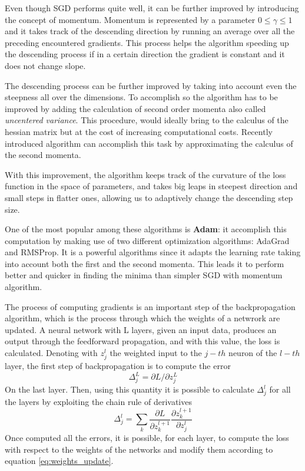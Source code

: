 \documentclass[11pt]{report}
\begin{document}
Even though SGD performs quite well, it can be further improved by introducing the concept of momentum.
Momentum is represented by a parameter $0\le \gamma \le 1$ and it takes track of the descending direction by running an average over all the preceding encountered gradients.
This process helps the algorithm speeding up the descending process if in a certain direction the gradient is constant and it does not change slope.

The descending process can be further improved by taking into account even the steepness all over the dimensions.
To accomplish so the algorithm has to be improved by adding the calculation of second order momenta also called \emph{uncentered variance}.
This procedure, would ideally bring to the calculus of the hessian matrix but at the cost of increasing computational costs.
Recently introduced algorithm can accomplish this task by approximating the calculus of the second momenta.

With this improvement, the algorithm keeps track of the curvature of the loss function in the space of parameters, and takes big leaps in steepest direction and small steps in flatter ones, allowing us to adaptively change the descending step size.

One of the most popular among these algorithms is \textbf{Adam}: it accomplish this computation by making use of two different optimization algorithms: AdaGrad and RMSProp.
It is a powerful algorithms since it adapts the learning rate taking into account both the first and the second momenta.
This leads it to perform better and quicker in finding the minima than simpler SGD with momentum algorithm.
\hfill

\noindent The process of computing gradients is an important step of the backpropagation algorithm, which is the process through which the weights of a netwrork are updated.
A neural network with L layers, given an input data, produces an output through the feedforward propagation, and with this value, the loss is calculated.
Denoting with $z_j^l$ the weighted input to the $j-th$ neuron of the $l-th$ layer, the first step of backpropagation is to compute the error
\[
\Delta_j^L =\partial L/\partial z_j^L
\]
On the last layer. Then, using this quantity it is possible to calculate $\Delta_j^l$ for all the layers by exploiting the chain rule of derivatives
\[
\Delta_j^l = \sum_k \frac{\partial L}{\partial z_k^{l+1}}\frac{\partial z_k^{l+1}}{\partial z_j^l}
\]
Once computed all the errors, it is possible, for each layer, to compute the loss with respect to the weights of the networks and modify them according to equation \ref{eq:weights_update}.
\end{document}
